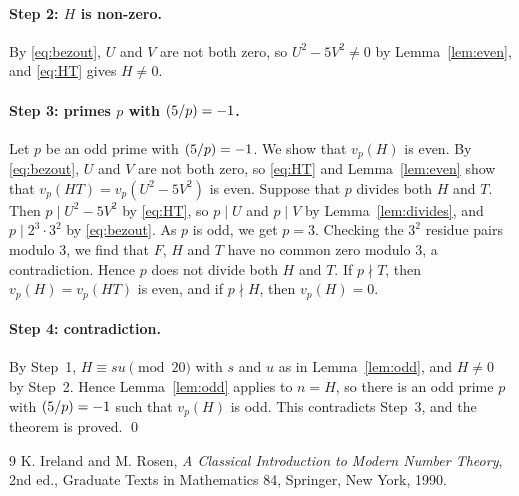 \documentclass[11pt]{article}
\newcommand{\leg}[2]{\mathchoice{\biggl(\dfrac{#1}{#2}\biggr)}{(#1/#2)}{(#1/#2)}{(#1/#2)}}
\begin{document}
\paragraph{Step 2: $H$ is non-zero.} By \eqref{eq:bezout}, $U$ and $V$ are not both zero, so $U^2-5V^2\neq0$ by Lemma~\ref{lem:even}, and \eqref{eq:HT} gives $H\neq0$.

\paragraph{\texorpdfstring{Step 3: primes $p$ with $\leg{5}{p}=-1$.}{Step 3: inert primes.}} Let $p$ be an odd prime with $\leg{5}{p}=-1$. We show that $v_p(H)$ is even. By \eqref{eq:bezout}, $U$ and $V$ are not both zero, so \eqref{eq:HT} and Lemma~\ref{lem:even} show that $v_p(HT)=v_p(U^2-5V^2)$ is even. Suppose that $p$ divides both $H$ and $T$. Then $p\mid U^2-5V^2$ by \eqref{eq:HT}, so $p\mid U$ and $p\mid V$ by Lemma~\ref{lem:divides}, and $p\mid 2^{3}\cdot 3^{2}$ by \eqref{eq:bezout}. As $p$ is odd, we get $p=3$. Checking the $3^2$ residue pairs modulo $3$, we find that $F$, $H$ and $T$ have no common zero modulo $3$, a contradiction. Hence $p$ does not divide both $H$ and $T$. If $p\nmid T$, then $v_p(H)=v_p(HT)$ is even, and if $p\nmid H$, then $v_p(H)=0$.

\paragraph{Step 4: contradiction.} By Step~1, $H\equiv su\pmod{20}$ with $s$ and $u$ as in Lemma~\ref{lem:odd}, and $H\neq0$ by Step~2. Hence Lemma~\ref{lem:odd} applies to $n=H$, so there is an odd prime $p$ with $\leg{5}{p}=-1$ such that $v_p(H)$ is odd. This contradicts Step~3, and the theorem is proved.
\qed

\begin{thebibliography}{9}
 K. Ireland and M. Rosen, \emph{A Classical Introduction to Modern Number Theory}, 2nd ed., Graduate Texts in Mathematics 84, Springer, New York, 1990.
\end{thebibliography}
\end{document}
